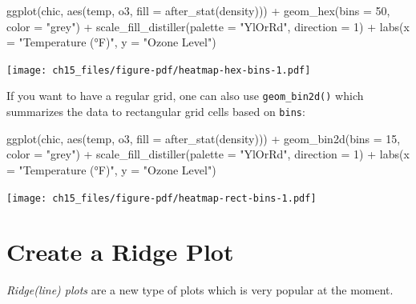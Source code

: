 \documentclass[
  letterpaper,
  DIV=11,
  numbers=noendperiod]{scrreprt}
\newenvironment{Shaded}{\begin{snugshade}}{\end{snugshade}}
\newcommand{\AttributeTok}[1]{\textcolor[rgb]{0.40,0.45,0.13}{#1}}
\newcommand{\DecValTok}[1]{\textcolor[rgb]{0.68,0.00,0.00}{#1}}
\newcommand{\FunctionTok}[1]{\textcolor[rgb]{0.28,0.35,0.67}{#1}}
\newcommand{\NormalTok}[1]{\textcolor[rgb]{0.00,0.23,0.31}{#1}}
\newcommand{\SpecialCharTok}[1]{\textcolor[rgb]{0.37,0.37,0.37}{#1}}
\newcommand{\StringTok}[1]{\textcolor[rgb]{0.13,0.47,0.30}{#1}}
\begin{document}
\begin{Shaded}
\begin{Highlighting}[]
\FunctionTok{ggplot}\NormalTok{(chic, }\FunctionTok{aes}\NormalTok{(temp, o3, }\AttributeTok{fill =} \FunctionTok{after\_stat}\NormalTok{(density))) }\SpecialCharTok{+}
  \FunctionTok{geom\_hex}\NormalTok{(}\AttributeTok{bins =} \DecValTok{50}\NormalTok{, }\AttributeTok{color =} \StringTok{"grey"}\NormalTok{) }\SpecialCharTok{+}
  \FunctionTok{scale\_fill\_distiller}\NormalTok{(}\AttributeTok{palette =} \StringTok{"YlOrRd"}\NormalTok{, }\AttributeTok{direction =} \DecValTok{1}\NormalTok{) }\SpecialCharTok{+}
  \FunctionTok{labs}\NormalTok{(}\AttributeTok{x =} \StringTok{"Temperature (°F)"}\NormalTok{, }\AttributeTok{y =} \StringTok{"Ozone Level"}\NormalTok{)}
\end{Highlighting}
\end{Shaded}

\texttt{[image: ch15\_files/figure-pdf/heatmap-hex-bins-1.pdf]}

If you want to have a regular grid, one can also use
\texttt{geom\_bin2d()} which summarizes the data to rectangular grid
cells based on \texttt{bins}:

\begin{Shaded}
\begin{Highlighting}[]
\FunctionTok{ggplot}\NormalTok{(chic, }\FunctionTok{aes}\NormalTok{(temp, o3, }\AttributeTok{fill =} \FunctionTok{after\_stat}\NormalTok{(density))) }\SpecialCharTok{+}
  \FunctionTok{geom\_bin2d}\NormalTok{(}\AttributeTok{bins =} \DecValTok{15}\NormalTok{, }\AttributeTok{color =} \StringTok{"grey"}\NormalTok{) }\SpecialCharTok{+}
  \FunctionTok{scale\_fill\_distiller}\NormalTok{(}\AttributeTok{palette =} \StringTok{"YlOrRd"}\NormalTok{, }\AttributeTok{direction =} \DecValTok{1}\NormalTok{) }\SpecialCharTok{+}
  \FunctionTok{labs}\NormalTok{(}\AttributeTok{x =} \StringTok{"Temperature (°F)"}\NormalTok{, }\AttributeTok{y =} \StringTok{"Ozone Level"}\NormalTok{)}
\end{Highlighting}
\end{Shaded}

\texttt{[image: ch15\_files/figure-pdf/heatmap-rect-bins-1.pdf]}

\section{Create a Ridge Plot}\label{create-a-ridge-plot}

\emph{Ridge(line) plots} are a new type of plots which is very popular
at the moment.
\end{document}
